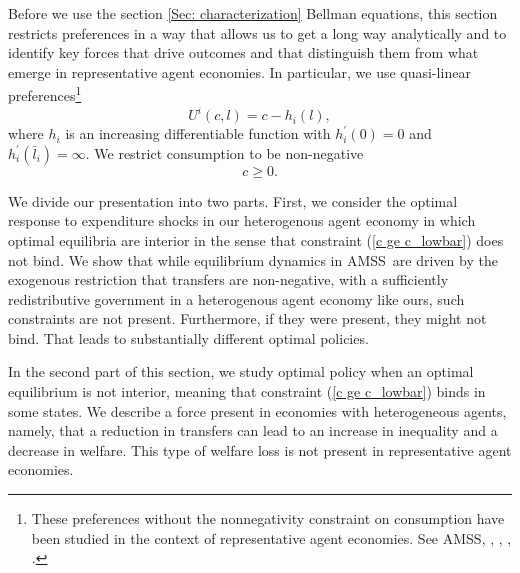 \documentclass[thmsb,11pt]{article}
\begin{document}
\smallskip
Before we use the section \ref{Sec: characterization}  Bellman equations, this section restricts preferences in a way that allows us to get a long way analytically and to identify
key forces that drive outcomes and that  distinguish them from what emerge in  representative agent economies.
In particular, we use  quasi-linear preferences\footnote{These preferences without the nonnegativity constraint on consumption have been studied in
the context of representative
agent economies.
See  AMSS, \cite{Farhi2010}, \cite{Battaglini2007,Battaglini2008}, \cite{Yared2012}, \cite{Faraglia2011}.}
\begin{equation}
U^{i}\left( c,l\right) =c-h_{i}(l),  \label{quasilinear}
\end{equation}%
where $h_{i}$ is an increasing differentiable function with $h_{i}^{\prime
}\left( 0\right) =0$ and $h_{i}^{\prime }\left( \bar{l}_{i}\right) =\infty $.
We restrict consumption  to be non-negative
\begin{equation}
c\geq 0.  \label{c ge c_lowbar}
\end{equation}%

We divide our presentation   into two parts. First, we
consider the optimal response to expenditure shocks in our heterogenous agent
economy in which optimal equilibria are interior in the sense that  constraint (\ref{c ge c_lowbar}) does not bind. %
We show that while  equilibrium dynamics in AMSS\ are
driven by the exogenous restriction that transfers are non-negative,  with a sufficiently redistributive government in
a heterogenous agent economy  like ours, such
constraints are not present. Furthermore, if they were present, they might not bind.  That leads to substantially different  optimal policies.

In the second part of this section, we  study  optimal policy when an optimal
equilibrium is not interior, meaning that constraint (\ref{c ge c_lowbar}) binds in
some states. We describe a force
 present in  economies  with heterogeneous %
 agents, namely, that a
reduction in transfers can lead to an increase in inequality and a
decrease in welfare. This type of welfare loss is not present in
representative agent economies.
\end{document}
